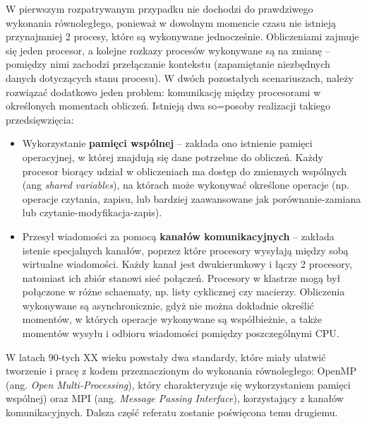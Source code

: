 W pierwszym rozpatrywanym przypadku nie dochodzi do prawdziwego wykonania równoległego, ponieważ w dowolnym momencie czasu nie istnieją przynajmniej 2 procesy, które są wykonywane jednocześnie. Obliczeniami zajmuje się jeden procesor, a kolejne rozkazy procesów wykonywane są na zmianę -- pomiędzy nimi zachodzi przełączanie kontekstu (zapamiętanie niezbędnych danych dotyczących stanu procesu). W dwóch pozostałych scenariuszach, należy rozwiązać dodatkowo jeden problem: komunikację między procesorami w określonych momentach obliczeń. Istnieją dwa so=posoby realizacji takiego przedsięwzięcia:

\begin{itemize}
	\item Wykorzystanie \textbf{pamięci wspólnej} -- zakłada ono istnienie pamięci operacyjnej, w której znajdują się dane potrzebne do obliczeń. Każdy procesor biorący udział w obliczeniach ma dostęp do zmiennych wspólnych (ang \textit{shared variables}), na którach może wykonywać określone operacje (np. operacje czytania, zapisu, lub bardziej zaawansowane jak porównanie-zamiana lub czytanie-modyfikacja-zapis).
	\item Przesył wiadomości za pomocą \textbf{kanałów komunikacyjnych} -- zakłada istenie specjalnych kanałów, poprzez które procesory wysyłają między sobą wirtualne wiadomości. Każdy kanał jest dwukierunkowy i łączy 2 procesory, natomiast ich zbiór stanowi sieć połączeń. Procesory w klastrze mogą był połączone w różne schaematy, np. listy cyklicznej czy macierzy. Obliczenia wykonywane są asynchronicznie, gdyż nie można dokładnie określić momentów, w których operacje wykonywane są współbieżnie, a także momentów wysyłu i odbioru wiadomości pomiędzy poszczególnymi CPU.
\end{itemize}

W latach 90-tych XX wieku powstały dwa standardy, które miały ułatwić tworzenie i pracę z kodem przeznaczionym do wykonania równoległego: OpenMP (ang. \textit{Open Multi-Processing}), który charakteryzuje się wykorzystaniem pamięci wspólnej) oraz MPI (ang. \textit{Message Passing Interface}), korzystający z kanałów komunikacyjnych. Dalsza część referatu zostanie poświęcona temu drugiemu.